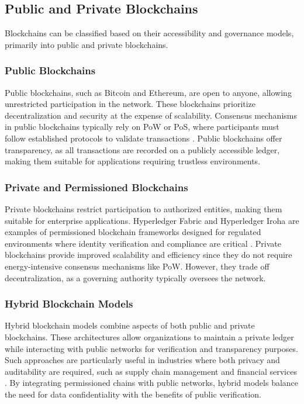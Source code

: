 \documentclass{article}
\begin{document}
\subsection{Public and Private Blockchains}

Blockchains can be classified based on their accessibility and governance models, primarily into public and private blockchains.

\subsubsection{Public Blockchains}
Public blockchains, such as Bitcoin and Ethereum, are open to anyone, allowing unrestricted participation in the network. These blockchains prioritize decentralization and security at the expense of scalability. Consensus mechanisms in public blockchains typically rely on PoW or PoS, where participants must follow established protocols to validate transactions \cite{buterin2020ghost}. Public blockchains offer transparency, as all transactions are recorded on a publicly accessible ledger, making them suitable for applications requiring trustless environments.

\subsubsection{Private and Permissioned Blockchains}

Private blockchains restrict participation to authorized entities, making them suitable for enterprise applications. Hyperledger Fabric and Hyperledger Iroha are examples of permissioned blockchain frameworks designed for regulated environments where identity verification and compliance are critical \cite{cachin2016architecture}. Private blockchains provide improved scalability and efficiency since they do not require energy-intensive consensus mechanisms like PoW. However, they trade off decentralization, as a governing authority typically oversees the network.


\subsubsection{Hybrid Blockchain Models}

Hybrid blockchain models combine aspects of both public and private blockchains. These architectures allow organizations to maintain a private ledger while interacting with public networks for verification and transparency purposes. Such approaches are particularly useful in industries where both privacy and auditability are required, such as supply chain management and financial services \cite{attanasi2020hybrid}. By integrating permissioned chains with public networks, hybrid models balance the need for data confidentiality with the benefits of public verification.
\end{document}
